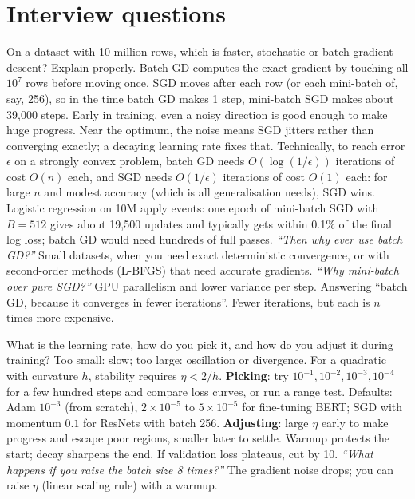 \section{Interview questions}

\begin{qa}{ On a dataset with 10 million rows, which is faster, stochastic or batch
gradient descent? Explain properly.}
\why
Batch GD computes the exact gradient by touching all $10^7$ rows before moving once. SGD moves after each row (or each
mini-batch of, say, 256), so in the time batch GD makes 1 step, mini-batch SGD makes about 39{,}000 steps. Early in
training, even a noisy direction is good enough to make huge progress. Near the optimum, the noise means SGD jitters rather
than converging exactly; a decaying learning rate fixes that.
Technically, to reach error $\epsilon$ on a strongly convex problem, batch GD needs $O(\log(1/\epsilon))$ iterations of cost
$O(n)$ each, and SGD needs $O(1/\epsilon)$ iterations of cost $O(1)$ each: for large $n$ and modest accuracy (which is all
generalisation needs), SGD wins.
\worked Logistic regression on 10M apply events: one epoch of mini-batch SGD with $B = 512$ gives about 19{,}500 updates
and typically gets within 0.1\% of the final log loss; batch GD would need hundreds of full passes.
\pushes \emph{``Then why ever use batch GD?''} Small datasets, when you need exact deterministic convergence, or with
second-order methods (L-BFGS) that need accurate gradients. \emph{``Why mini-batch over pure SGD?''} GPU parallelism and
lower variance per step.
\pitfall Answering ``batch GD, because it converges in fewer iterations''. Fewer iterations, but each is $n$ times more
expensive.
\end{qa}

\begin{qa}{ What is the learning rate, how do you pick it, and how do you adjust it during
training?}
\why
Too small: slow; too large: oscillation or divergence. For a quadratic with curvature $h$, stability requires $\eta < 2/h$.
\textbf{Picking}: try $10^{-1}, 10^{-2}, 10^{-3}, 10^{-4}$ for a few hundred steps and compare loss curves, or run a range
test. Defaults: Adam $10^{-3}$ (from scratch), $2\times10^{-5}$ to $5\times10^{-5}$ for fine-tuning BERT; SGD with momentum
$0.1$ for ResNets with batch 256.
\textbf{Adjusting}: large $\eta$ early to make progress and escape poor regions, smaller later to settle. Warmup protects
the start; decay sharpens the end. If validation loss plateaus, cut by 10.
\pushes \emph{``What happens if you raise the batch size 8 times?''} The gradient noise drops; you can raise $\eta$ (linear
scaling rule) with a warmup.
\end{qa}

